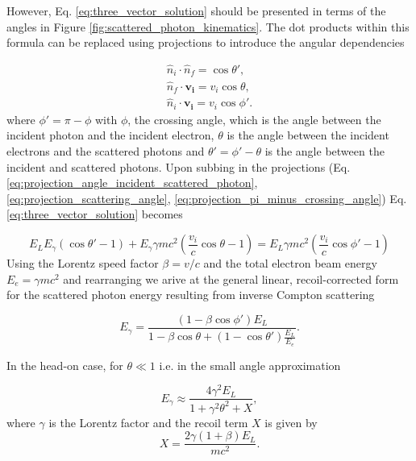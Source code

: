 \documentclass[../main.tex]{subfiles}
\begin{document}
However, Eq. \ref{eq:three_vector_solution} should be presented in terms of the angles in Figure \ref{fig:scattered_photon_kinematics}. The dot products within this formula can be replaced using projections to introduce the angular dependencies

\begin{align}
\hat{n}_{i}\cdot\hat{n}_{f} = \cos\theta',
\label{eq:projection_angle_incident_scattered_photon}\\
\hat{n}_{f}\cdot \boldsymbol{v_{i}} = v_{i}\cos\theta,
\label{eq:projection_scattering_angle}\\
\hat{n}_{i}\cdot \boldsymbol{v_{i}} = v_{i}\cos\phi'.
\label{eq:projection_pi_minus_crossing_angle}
\end{align}
where $\phi'=\pi-\phi$ with $\phi$, the crossing angle, which is the angle between the incident photon and the incident electron, $\theta$ is the angle between the incident electrons and the scattered photons and $\theta'=\phi'-\theta$ is the angle between the incident and scattered photons. Upon subbing in the projections (Eq. \ref{eq:projection_angle_incident_scattered_photon}, \ref{eq:projection_scattering_angle}, \ref{eq:projection_pi_minus_crossing_angle}) Eq. \ref{eq:three_vector_solution} becomes

\begin{equation}
E_{L}E_{\gamma}\left(\cos\theta'-1\right)+E_{\gamma}\gamma mc^{2}\left(\frac{v_{i}}{c}\cos\theta-1\right) = E_{L}\gamma mc^{2}\left( \frac{v_{i}}{c}\cos\phi'-1\right)
\label{eq:three_vector_solution_projections}
\end{equation}
Using the Lorentz speed factor $\beta = v/c$ and the total electron beam energy $E_{e} = \gamma mc^{2}$ and rearranging we arive at the general linear, recoil-corrected form for the scattered photon energy resulting from inverse Compton scattering 

\begin{equation}
E_{\gamma} = \frac{\left(1-\beta\cos\phi'\right)E_{L}}{1-\beta\cos\theta+\left(1-\cos\theta'\right)\frac{E_{L}}{E_{e}}}. 
\label{eq:scattered_photon_energy}
\end{equation}
  
In the head-on case, for $\theta \ll 1$ i.e. in the small angle approximation

\begin{equation}
E_{\gamma} \approx \frac{4\gamma^{2}E_{L}}{1+\gamma^{2}\theta^{2}+X},    
\label{eq:small_angle_scattered_photon_energy}
\end{equation}
where $\gamma$ is the Lorentz factor and the recoil term $X$ is given by
\begin{equation}
X = \frac{2\gamma\left(1+\beta\right)E_{L}}{mc^{2}}.
\label{eq:recoil_term}
\end{equation}
\end{document}
